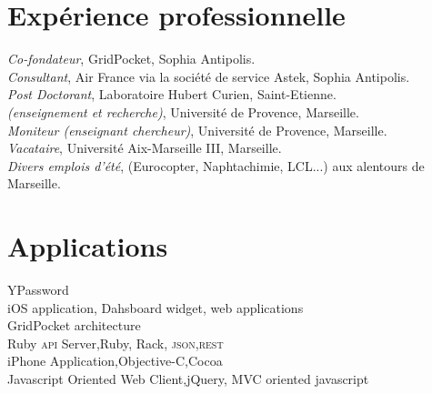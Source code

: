 
\newcommand{\short}{Short publications}


\reversemarginpar



\afficheContactInfos

\section*{Expérience professionnelle}

\noindent{}\emph{Co-fondateur}, GridPocket, Sophia Antipolis.\\
\noindent{}\emph{Consultant}, Air France via la société de service Astek, Sophia Antipolis.\\
\emph{Post Doctorant}, Laboratoire Hubert Curien, Saint-Etienne.\\
\emph{ {\footnotesize (enseignement et recherche)}}, Université de Provence, Marseille.\\
\emph{Moniteur (enseignant \amper{} chercheur)}, Université de Provence, Marseille.\\
\emph{Vacataire}, Université Aix-Marseille III, Marseille.\\
\emph{Divers emplois d'été}, {\footnotesize (Eurocopter, Naphtachimie, LCL...) } aux alentours de Marseille.

\section*{Applications}

YPassword\\
{\footnotesize \phantom{espace}iOS application, Dahsboard widget, web applications}\\


GridPocket architecture\\
{\footnotesize \phantom{espace}Ruby \textsc{api} Server,\hfill Ruby, Rack, \textsc{json,rest}}\\
{\footnotesize \phantom{espace}iPhone Application,\hfill Objective-C,Cocoa }\\
{\footnotesize \phantom{espace}Javascript Oriented Web Client,\hfill jQuery, MVC oriented javascript}\\


